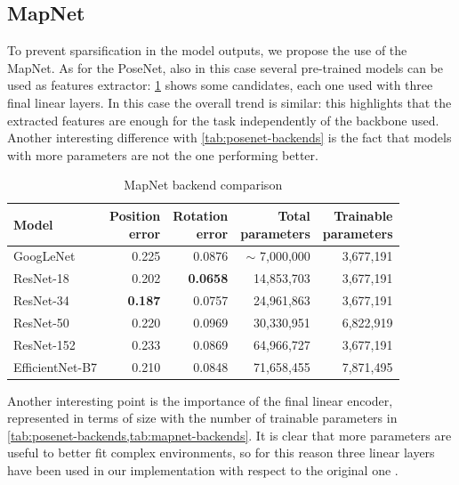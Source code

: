 \subsection{MapNet}
To prevent sparsification in the model outputs, we propose the use of the MapNet. As for the PoseNet, also in this case several pre-trained models can be used as features extractor: \cref{tab:mapnet-backends} shows some candidates, each one used with three final linear layers.
In this case the overall trend is similar: this highlights that the extracted features are enough for the task independently of the backbone used. Another interesting difference with \cref{tab:posenet-backends} is the fact that models with more parameters are not the one performing better.
\begin{table}[htbp]
    \caption{MapNet backend comparison}
    \begin{center}
        \begin{tabular}{lrrrr}
            \toprule
            {Model}         & \thead{Position                                                  \\error} & \thead{Rotation\\error} & \thead{Total\\parameters} & \thead{Trainable\\parameters} \\
            \midrule
            GoogLeNet       & 0.225           & 0.0876          & $\sim$ 7,000,000 & 3,677,191 \\
            ResNet-18       & 0.202           & \textbf{0.0658} & 14,853,703       & 3,677,191 \\
            ResNet-34       & \textbf{0.187}  & 0.0757          & 24,961,863       & 3,677,191 \\
            ResNet-50       & 0.220           & 0.0969          & 30,330,951       & 6,822,919 \\
            ResNet-152      & 0.233           & 0.0869          & 64,966,727       & 3,677,191 \\
            EfficientNet-B7 & 0.210           & 0.0848          & 71,658,455       & 7,871,495 \\
            \bottomrule
        \end{tabular}
        \label{tab:mapnet-backends}
    \end{center}
\end{table}

Another interesting point is the importance of the final linear encoder, represented in terms of size with the number of trainable parameters in \cref{tab:posenet-backends,tab:mapnet-backends}. It is clear that more parameters are useful to better fit complex environments, so for this reason three linear layers have been used in our implementation with respect to the original one \cite{mapnet}.

